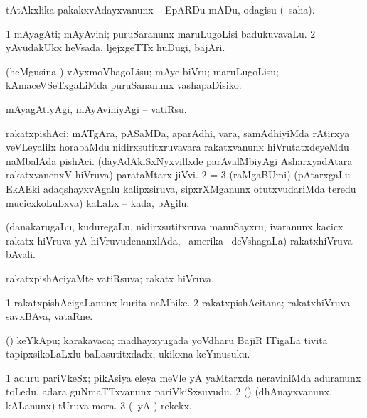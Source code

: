 \noindent 
\gl{\akirx}
\expl{}
\bmng
 tAtAkxlika pakakxvAdayxvanunx -- EpARDu mADu, odagisu (\sakirx\ saha). 
\emng
\eentry

\bentry
{} 
\gl{\nA}
\expl{}
\bmng
\bnum
\num{1} mAyagAti; mAyAvini; puruSaranunx maruLugoLisi badukuvavaLu. 
\num{2} yAvudakUkx heVsada, ljejxgeTTx huDugi, bajAri. 
\enum
\emng
\eentry

\bentry
{} 
\gl{\sakirx}
\expl{}
\bmng
 (heMgusina \vi) vAyxmoVhagoLisu; mAye biVru; maruLugoLisu; kAmaceVSeTxgaLiMda puruSananunx vashapaDisiko. 
\emng

\noindent
\gl{\akirx}
\bmng
mAyagAtiyAgi, mAyAviniyAgi -- vatiRsu. 
\emng
\eentry

\bentry
{} 
\gl{\nA}
\expl{}
\bmng
\bnum
{} rakatxpishAci: 
\banum
{} mATgAra, pASaMDa, aparAdhi, \mo vara, samAdhiyiMda rAtirxya veVLeyalilx horabaMdu nidirxsutitxruvavara rakatxvanunx hiVrutatxdeyeMdu naMbalAda pishAci. 
 (dayAdAkiSxNyxvillxde parAvalMbiyAgi AsharxyadAtara rakatxvanenxV hiVruva) parataMtarx jiVvi. 
\eanum
\numie
\num{2} =  
\num{3} (raMgaBUmi) (pAtarxgaLu EkAEki adaqshayxvAgalu kalipxsiruva, sipxrXMganunx otutxvudariMda teredu mucicxkoLuLxva) kaLaLx -- kada, bAgilu. 
\enum
\emng
\eentry

\bentry
{}
\gl{\nA}
\expl{}
\bmng
 (danakarugaLu, kuduregaLu, nidirxsutitxruva manuSayxru, ivaranunx kacicx rakatx hiVruva yA hiVruvudenanxlAda, \da\ amerika \mo\ deVshagaLa) rakatxhiVruva bAvali. 
\emng
\eentry

\bentry
{} 
\gl{\gu}
\expl{}
\bmng
rakatxpishAciyaMte vatiRsuva; rakatx hiVruva. 
\emng
\eentry

\bentry
{} 
\gl{\nA}
\expl{}
\bmng
\bnum
\num{1} rakatxpishAcigaLanunx kurita naMbike. 
\num{2} rakatxpishAcitana; rakatxhiVruva savxBAva, vataRne. 
\enum
\emng
\eentry

\bentry
{} 
\gl{\nA}
\expl{}
\bmng
 (\ca) keYkApu; karakavaca; madhayxyugada yoVdharu BajiR ITigaLa tivita tapipxsikoLaLxlu baLasutitxdadx, ukikxna keYmusuku. 
\emng
\eentry

\bentry
{} 
\gl{\nA}
\expl{}
\bmng
\bnum
\num{1} aduru pariVkeSx; pikAsiya eleya meVle yA yaMtarxda neraviniMda aduranunx toLedu, adara guNmaTTxvanunx pariVkiSxsuvudu. 
\num{2} (\pArxparx) (dhAnayxvanunx, kALanunx) tUruva mora. 
\num{3} (\pArxparx\ yA \kAparx) rekekx. 
\enum
\emng
\eentry


